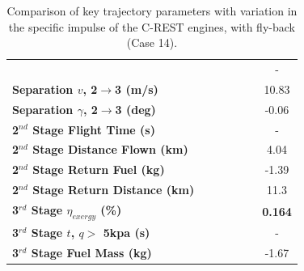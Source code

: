 \begin{table}[ht]
\begin{tabular}{l c c c c c c}
		& \secondthirdSeparationAltIspNinety
		& \secondthirdSeparationAltIspNinetyFive
		& \secondthirdSeparationAltIspStandard
		& \secondthirdSeparationAltIspOneHundredFive
		& \secondthirdSeparationAltIspOneHundredTen
		& -
		\\
		\textbf{Separation $v$, 2$\rightarrow$3 (m/s)}
		& \secondthirdSeparationvIspNinety
		& \secondthirdSeparationvIspNinetyFive
		& \secondthirdSeparationvIspStandard
		& \secondthirdSeparationvIspOneHundredFive
		& \secondthirdSeparationvIspOneHundredTen
		&10.83
		\\
		\textbf{Separation $\gamma$, 2$\rightarrow$3 (deg)}
		& \secondthirdSeparationgammaIspNinety
		& \secondthirdSeparationgammaIspNinetyFive
		& \secondthirdSeparationgammaIspStandard
		& \secondthirdSeparationgammaIspOneHundredFive
		& \secondthirdSeparationgammaIspOneHundredTen
		&-0.06
		\\
		\textbf{2$^{nd}$ Stage Flight Time (s)}
		& \secondFlightTimeIspNinety
		& \secondFlightTimeIspNinetyFive
		& \secondFlightTimeIspStandard
		& \secondFlightTimeIspOneHundredFive
		& \secondFlightTimeIspOneHundredTen
		& -
		\\
		\textbf{2$^{nd}$ Stage Distance Flown (km)}
		& \SecondDistIspNinety
		& \SecondDistIspNinetyFive
		& \SecondDistIspStandard
		& \SecondDistIspOneHundredFive
		& \SecondDistIspOneHundredTen
		&4.04
		\\
		\textbf{2$^{nd}$ Stage Return Fuel (kg)}
		& \returnFuelIspNinety
		& \returnFuelIspNinetyFive
		& \returnFuelIspStandard
		& \returnFuelIspOneHundredFive
		& \returnFuelIspOneHundredTen
		&-1.39
		\\
		\textbf{2$^{nd}$ Stage Return Distance (km)}
		& \returnDistIspNinety
		& \returnDistIspNinetyFive
		& \returnDistIspStandard
		& \returnDistIspOneHundredFive
		& \returnDistIspOneHundredTen
		&11.3
		\\
		\hline 
		\textbf{3$^{rd}$ Stage $\eta_{exergy}$ (\%)}
		& \textbf{\thirddExergyEffIspNinety}
		& \textbf{\thirddExergyEffIspNinetyFive}
		& \textbf{\thirddExergyEffIspStandard}
		& \textbf{\thirddExergyEffIspOneHundredFive}
		& \textbf{\thirddExergyEffIspOneHundredTen}
		& \textbf{0.164}
		\\
		\textbf{3$^{rd}$ Stage $t$, $q >$ 5kpa (s)}
		& \thirdqOverFiveIspNinety
		& \thirdqOverFiveIspNinetyFive
		& \thirdqOverFiveIspStandard
		& \thirdqOverFiveIspOneHundredFive
		& \thirdqOverFiveIspOneHundredTen
		& -
		\\
		\textbf{3$^{rd}$ Stage Fuel Mass (kg)}
		& \thirdmFuelIspNinety
		& \thirdmFuelIspNinetyFive
		& \thirdmFuelIspStandard
		& \thirdmFuelIspOneHundredFive
		& \thirdmFuelIspOneHundredTen
		&-1.67
		\\
		\hline 
	\end{tabular} 
	
	\caption{Comparison of key trajectory parameters with variation in the specific impulse of the C-REST engines, with fly-back (Case 14).}
	\label{tab:comparison31}
\end{table}

